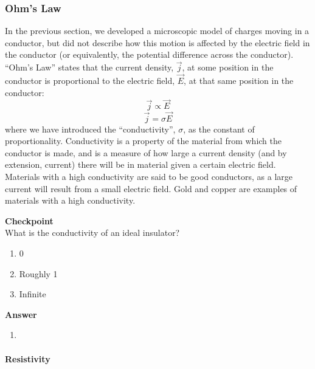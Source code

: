 \subsubsection{Ohm's Law}

In the previous section, we developed a microscopic model of charges moving in a conductor, but did not describe how this motion is affected by the electric field in the conductor (or equivalently, the potential difference across the conductor). ``Ohm's Law'' states that the current density, $\vec j$, at some position in the conductor is proportional to the electric field, $\vec E$, at that same position in the conductor:
\begin{equation}
\vec j \propto \vec E
\end{equation}
\begin{equation}
\boxed{\vec j = \sigma \vec E}
\end{equation}
where we have introduced the ``conductivity'', $\sigma$, as the constant of proportionality. Conductivity is a property of the material from which the conductor is made, and is a measure of how large a current density (and by extension, current) there will be in material given a certain electric field. Materials with a high conductivity are said to be good conductors, as a large current will result from a small electric field. Gold and copper are examples of materials with a high conductivity.

\begin{framed}
\textbf{Checkpoint}\\
What is the conductivity of an ideal insulator?

\begin{enumerate}
\item 0
\item Roughly 1
\item Infinite
\end{enumerate}

\begin{framed}
\textbf{Answer}\\
\begin{enumerate}
\item
\end{enumerate}
\end{framed}
\end{framed}

\paragraph{Resistivity}


